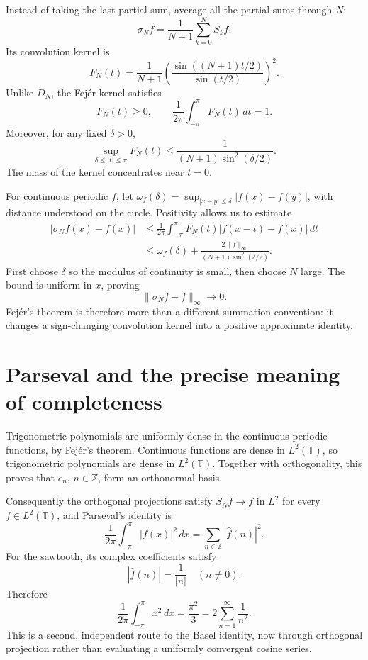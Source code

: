 Instead of taking the last partial sum, average all the partial sums through \(N\):
\[
 \sigma_Nf=\frac1{N+1}\sum_{k=0}^NS_kf.
\]
Its convolution kernel is
\[
 \boxed{F_N(t)=\frac1{N+1}
 \left(\frac{\sin((N+1)t/2)}{\sin(t/2)}\right)^2.}
\]
Unlike \(D_N\), the Fejér kernel satisfies
\[
 F_N(t)\ge0,\qquad
 \frac1{2\pi}\int_{-\pi}^{\pi}F_N(t)\,dt=1.
\]
Moreover, for any fixed \(\delta>0\),
\[
 \sup_{\delta\le|t|\le\pi}F_N(t)
 \le\frac{1}{(N+1)\sin^2(\delta/2)}.
\]
The mass of the kernel concentrates near \(t=0\).

For continuous periodic \(f\), let
\(\omega_f(\delta)=\sup_{|x-y|\le\delta}|f(x)-f(y)|\), with distance understood on the circle. Positivity allows us to estimate
\[
\begin{aligned}
 |\sigma_Nf(x)-f(x)|
 &\le \frac1{2\pi}
 \int_{-\pi}^{\pi}F_N(t)|f(x-t)-f(x)|\,dt\\
 &\le \omega_f(\delta)
  +\frac{2\|f\|_\infty}
         {(N+1)\sin^2(\delta/2)}.
\end{aligned}
\]
First choose \(\delta\) so the modulus of continuity is small, then choose \(N\) large. The bound is uniform in \(x\), proving
\[
 \boxed{\|\sigma_Nf-f\|_\infty\longrightarrow0.}
\]
Fejér's theorem is therefore more than a different summation convention: it changes a sign-changing convolution kernel into a positive approximate identity.

\section{Parseval and the precise meaning of completeness}

Trigonometric polynomials are uniformly dense in the continuous periodic functions, by Fejér's theorem. Continuous functions are dense in \(L^2(\mathbb T)\), so trigonometric polynomials are dense in \(L^2(\mathbb T)\). Together with orthogonality, this proves that \(e_n\), \(n\in\mathbb Z\), form an orthonormal basis.

Consequently the orthogonal projections satisfy \(S_Nf\to f\) in \(L^2\) for every \(f\in L^2(\mathbb T)\), and Parseval's identity is
\[
 \boxed{\frac1{2\pi}\int_{-\pi}^{\pi}|f(x)|^2\,dx
 =\sum_{n\in\mathbb Z}|\widehat f(n)|^2.}
\]
For the sawtooth, its complex coefficients satisfy
\[
 |\widehat f(n)|=\frac1{|n|}\quad(n\ne0).
\]
Therefore
\[
 \frac1{2\pi}\int_{-\pi}^{\pi}x^2\,dx
 =\frac{\pi^2}{3}
 =2\sum_{n=1}^{\infty}\frac1{n^2}.
\]
This is a second, independent route to the Basel identity, now through orthogonal projection rather than evaluating a uniformly convergent cosine series.

